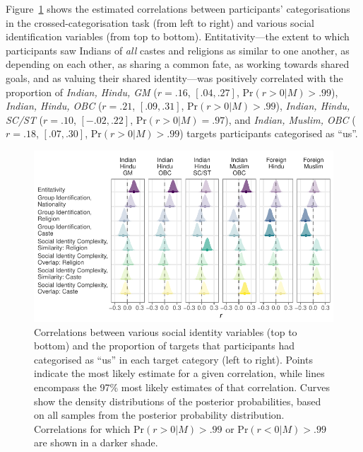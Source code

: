 \documentclass[12pt, a4paper]{article}
\begin{document}
Figure~\ref{fig:ch4-appendix-1} shows the estimated correlations between participants' categorisations in the crossed-categorisation task (from left to right) and various social identification variables (from top to bottom). Entitativity---the extent to which participants saw Indians of \emph{all} castes and religions as similar to one another, as depending on each other, as sharing a common fate, as working towards shared goals, and as valuing their shared identity---was positively correlated with the proportion of \emph{Indian, Hindu, GM} ($r = .16$, $[.04, .27]$, $\text{Pr} (r > 0|M) > .99$), \emph{Indian, Hindu, OBC} ($r = .21$, $[.09, .31]$, $\text{Pr} (r > 0| M) > .99$), \emph{Indian, Hindu, SC/ST} ($r = .10$, $[-.02, .22]$, $\text{Pr} (r > 0| M) = .97$), and \emph{Indian, Muslim, OBC} ($r = .18$, $[.07, .30]$, $\text{Pr} (r > 0| M) > .99$) targets participants categorised as ``us''.

\begin{figure}
\centering
\includegraphics[scale=1]{../figures/appendices/appendices-e-1}
\caption[Correlations between social identity variables and target categorisations]{Correlations between various social identity variables (top to bottom) and the proportion of targets that participants had categorised as ``us'' in each target category (left to right). Points indicate the most likely estimate for a given correlation, while lines encompass the 97\% most likely estimates of that correlation. Curves show the density distributions of the posterior probabilities, based on all samples from the posterior probability distribution. Correlations for which $\text{Pr} (r > 0| M) > .99$ or $\text{Pr} (r < 0| M) > .99$ are shown in a darker shade.}
\label{fig:ch4-appendix-1}
\end{figure}
\end{document}
